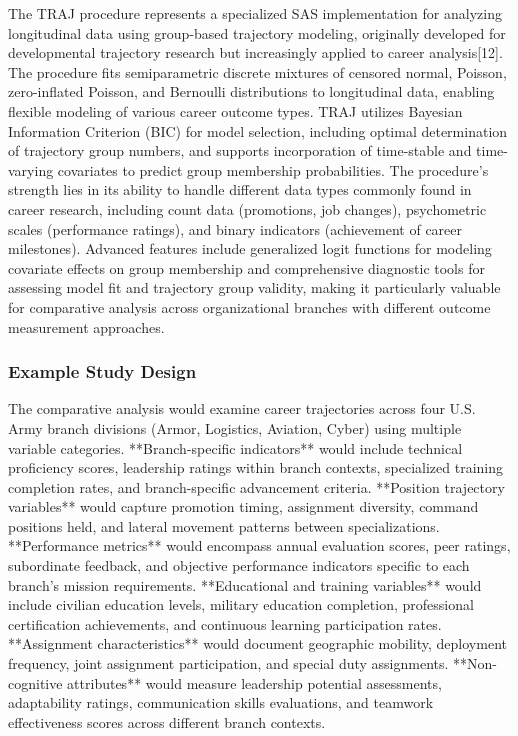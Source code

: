 \documentclass[main.tex]{subfiles}
\begin{document}

The TRAJ procedure represents a specialized SAS implementation for analyzing longitudinal data using group-based trajectory modeling, originally developed for developmental trajectory research but increasingly applied to career analysis[12]. The procedure fits semiparametric discrete mixtures of censored normal, Poisson, zero-inflated Poisson, and Bernoulli distributions to longitudinal data, enabling flexible modeling of various career outcome types. TRAJ utilizes Bayesian Information Criterion (BIC) for model selection, including optimal determination of trajectory group numbers, and supports incorporation of time-stable and time-varying covariates to predict group membership probabilities. The procedure's strength lies in its ability to handle different data types commonly found in career research, including count data (promotions, job changes), psychometric scales (performance ratings), and binary indicators (achievement of career milestones). Advanced features include generalized logit functions for modeling covariate effects on group membership and comprehensive diagnostic tools for assessing model fit and trajectory group validity, making it particularly valuable for comparative analysis across organizational branches with different outcome measurement approaches.

\subsubsection{Example Study Design}


The comparative analysis would examine career trajectories across four U.S. Army branch divisions (Armor, Logistics, Aviation, Cyber) using multiple variable categories. **Branch-specific indicators** would include technical proficiency scores, leadership ratings within branch contexts, specialized training completion rates, and branch-specific advancement criteria. **Position trajectory variables** would capture promotion timing, assignment diversity, command positions held, and lateral movement patterns between specializations. **Performance metrics** would encompass annual evaluation scores, peer ratings, subordinate feedback, and objective performance indicators specific to each branch's mission requirements. **Educational and training variables** would include civilian education levels, military education completion, professional certification achievements, and continuous learning participation rates. **Assignment characteristics** would document geographic mobility, deployment frequency, joint assignment participation, and special duty assignments. **Non-cognitive attributes** would measure leadership potential assessments, adaptability ratings, communication skills evaluations, and teamwork effectiveness scores across different branch contexts.
\end{document}

